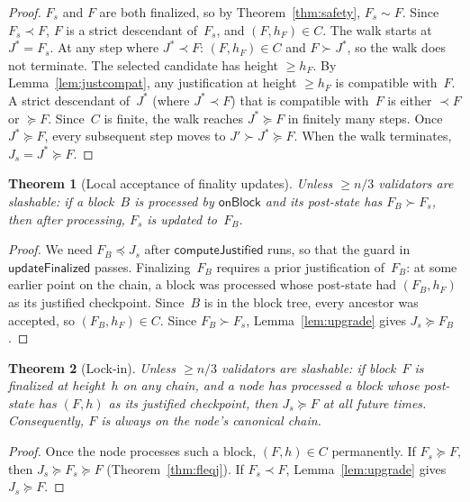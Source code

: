 \ifx\litemode\undefined\documentclass{article}\fi
\theoremstyle{plain}
\newtheorem{theorem}{Theorem}
\theoremstyle{definition}
\theoremstyle{remark}
\begin{document}
\begin{proof}
$F_s$ and $F$ are both finalized, so by Theorem~\ref{thm:safety}, $F_s \sim F$.
Since $F_s \prec F$, $F$ is a strict descendant of~$F_s$, and $(F, h_F) \in C$.
The walk starts at $J^* = F_s$.
At any step where $J^* \prec F$: $(F, h_F) \in C$ and $F \succ J^*$, so the walk does not terminate.
The selected candidate has height $\geq h_F$.
By Lemma~\ref{lem:justcompat}, any justification at height $\geq h_F$ is compatible with~$F$.
A strict descendant of~$J^*$ (where $J^* \prec F$) that is compatible with~$F$ is either $\prec F$ or $\succeq F$.
Since~$C$ is finite, the walk reaches $J^* \succeq F$ in finitely many steps.
Once $J^* \succeq F$, every subsequent step moves to $J' \succ J^* \succeq F$.
When the walk terminates, $J_s = J^* \succeq F$.
\end{proof}

\begin{theorem}[Local acceptance of finality updates]\label{thm:finlive}
Unless $\geq n/3$ validators are slashable: if a block~$B$ is processed by $\textsf{onBlock}$ and its post-state has $F_B \succ F_s$, then after processing, $F_s$ is updated to~$F_B$.
\end{theorem}

\begin{proof}
We need $F_B \preceq J_s$ after $\textsf{computeJustified}$ runs, so that the guard in $\textsf{updateFinalized}$ passes.
Finalizing~$F_B$ requires a prior justification of~$F_B$: at some earlier point on the chain, a block was processed whose post-state had $(F_B, h_F)$ as its justified checkpoint.
Since~$B$ is in the block tree, every ancestor was accepted, so $(F_B, h_F) \in C$.
Since $F_B \succ F_s$, Lemma~\ref{lem:upgrade} gives $J_s \succeq F_B$.
\end{proof}

\begin{theorem}[Lock-in]\label{thm:lockin}
Unless $\geq n/3$ validators are slashable: if block~$F$ is finalized at height~$h$ on any chain, and a node has processed a block whose post-state has $(F, h)$ as its justified checkpoint, then $J_s \succeq F$ at all future times.
Consequently, $F$ is always on the node's canonical chain.
\end{theorem}

\begin{proof}
Once the node processes such a block, $(F, h) \in C$ permanently.
If $F_s \succeq F$, then $J_s \succeq F_s \succeq F$ (Theorem~\ref{thm:fleqj}).
If $F_s \prec F$, Lemma~\ref{lem:upgrade} gives $J_s \succeq F$.
\end{proof}
\end{document}

